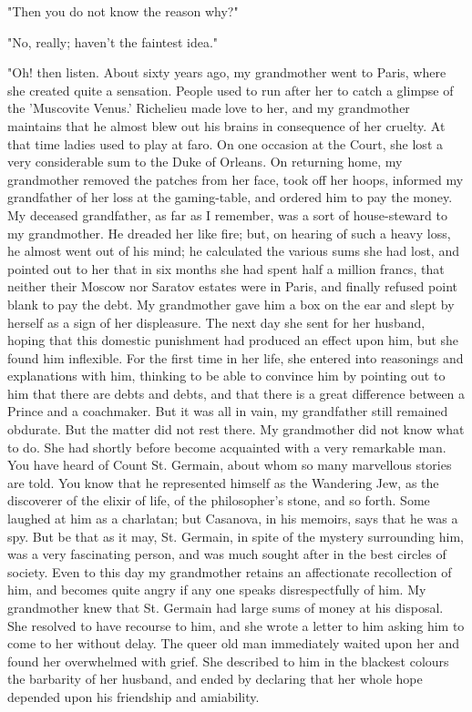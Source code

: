 "Then you do not know the reason why?"

"No, really; haven't the faintest idea."

"Oh! then listen. About sixty years ago, my grandmother went to Paris,
where she created quite a sensation. People used to run after her to
catch a glimpse of the 'Muscovite Venus.' Richelieu made love to her,
and my grandmother maintains that he almost blew out his brains in
consequence of her cruelty. At that time ladies used to play at faro.
On one occasion at the Court, she lost a very considerable sum to the
Duke of Orleans. On returning home, my grandmother removed the patches
from her face, took off her hoops, informed my grandfather of her loss
at the gaming-table, and ordered him to pay the money. My deceased
grandfather, as far as I remember, was a sort of house-steward to my
grandmother. He dreaded her like fire; but, on hearing of such a heavy
loss, he almost went out of his mind; he calculated the various sums
she had lost, and pointed out to her that in six months she had spent
half a million francs, that neither their Moscow nor Saratov estates
were in Paris, and finally refused point blank to pay the debt. My
grandmother gave him a box on the ear and slept by herself as a sign
of her displeasure. The next day she sent for her husband, hoping that
this domestic punishment had produced an effect upon him, but she
found him inflexible. For the first time in her life, she entered into
reasonings and explanations with him, thinking to be able to convince
him by pointing out to him that there are debts and debts, and that
there is a great difference between a Prince and a coachmaker. But it
was all in vain, my grandfather still remained obdurate. But the
matter did not rest there. My grandmother did not know what to do. She
had shortly before become acquainted with a very remarkable man. You
have heard of Count St. Germain, about whom so many marvellous stories
are told. You know that he represented himself as the Wandering Jew,
as the discoverer of the elixir of life, of the philosopher's stone,
and so forth. Some laughed at him as a charlatan; but Casanova, in his
memoirs, says that he was a spy. But be that as it may, St. Germain,
in spite of the mystery surrounding him, was a very fascinating
person, and was much sought after in the best circles of society. Even
to this day my grandmother retains an affectionate recollection of
him, and becomes quite angry if any one speaks disrespectfully of him.
My grandmother knew that St. Germain had large sums of money at his
disposal. She resolved to have recourse to him, and she wrote a letter
to him asking him to come to her without delay. The queer old man
immediately waited upon her and found her overwhelmed with grief. She
described to him in the blackest colours the barbarity of her husband,
and ended by declaring that her whole hope depended upon his
friendship and amiability.


